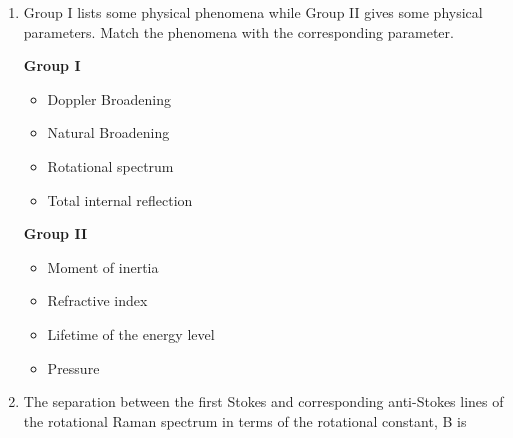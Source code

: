 \documentclass[14pt, a4paper]{extarticle}
\begin{document}
\begin{enumerate}[label=\textbf{Q. \arabic*}]
\item Group I lists some physical phenomena while Group II gives some physical parameters. Match the phenomena with the corresponding parameter.
    \begin{center}
    \begin{multicols}{2}
        \textbf{Group I}
        \begin{itemize}
            \item[P.] Doppler Broadening
            \item[Q.] Natural Broadening
            \item[R.] Rotational spectrum
            \item[S.] Total internal reflection
        \end{itemize}
        \textbf{Group II}
        \begin{itemize}
            \item[1.] Moment of inertia
            \item[2.] Refractive index
            \item[3.] Lifetime of the energy level
            \item[4.] Pressure
        \end{itemize}
    \end{multicols}
    \end{center}
    \begin{enumerate}[label=(\Alph*)]
    \end{enumerate}

\item The separation between the first Stokes and corresponding anti-Stokes lines of the rotational Raman spectrum in terms of the rotational constant, B is
    \begin{enumerate}[label=(\Alph*)]
    \end{enumerate}


\end{enumerate}
\end{document}
